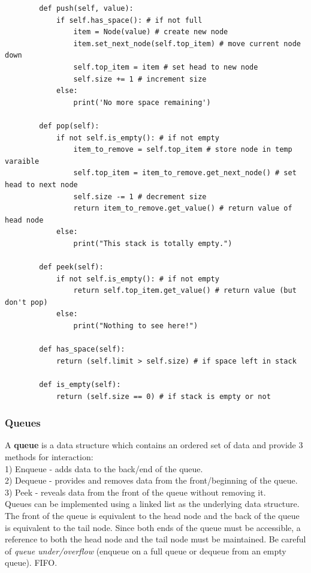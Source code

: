 \documentclass[11pt, a4paper]{article}
\begin{document}
\begin{spacing}{1.1}
\begin{lstlisting}
		def push(self, value):
			if self.has_space(): # if not full
				item = Node(value) # create new node
				item.set_next_node(self.top_item) # move current node down
				self.top_item = item # set head to new node
				self.size += 1 # increment size
			else:
				print('No more space remaining')
		
		def pop(self):
			if not self.is_empty(): # if not empty
				item_to_remove = self.top_item # store node in temp varaible
				self.top_item = item_to_remove.get_next_node() # set head to next node
				self.size -= 1 # decrement size
				return item_to_remove.get_value() # return value of head node
			else:
				print("This stack is totally empty.")
		
		def peek(self):
			if not self.is_empty(): # if not empty
				return self.top_item.get_value() # return value (but don't pop)
			else:
				print("Nothing to see here!")
		
		def has_space(self):
			return (self.limit > self.size) # if space left in stack
		
		def is_empty(self):
			return (self.size == 0) # if stack is empty or not	\end{lstlisting}\vspace*{2mm}
	\subsubsection{Queues}
	A \textbf{queue} is a data structure which contains an ordered set of data and provide 3 methods for interaction: \\
	\hspace*{3mm} 1) Enqueue - adds data to the back/end of the queue. \\
	\hspace*{3mm} 2) Dequeue - provides and removes data from the front/beginning of the queue. \\
	\hspace*{3mm} 3) Peek - reveals data from the front of the queue without removing it. \vspace*{1mm} \\
	Queues can be implemented using a linked list as the underlying data structure. The front of the queue is equivalent to the head node and the back of the queue is equivalent to the tail node. Since both ends of the queue must be accessible, a reference to both the head node and the tail node must be maintained. Be careful of \textit{queue under/overflow} (enqueue on a full queue or dequeue from an empty queue). FIFO. \newpage
	

\end{spacing}
\end{document}
